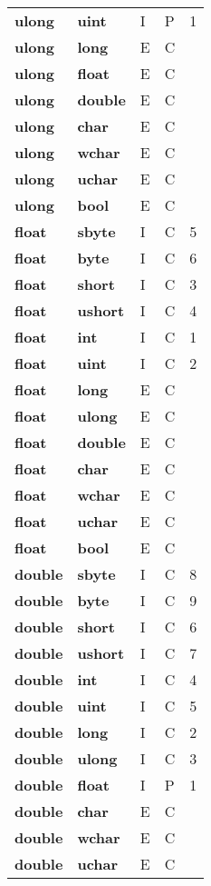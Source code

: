 \documentclass[a4paper,oneside,11pt]{book}
\theoremstyle{definition}
\begin{document}
\begin{flushleft}
\begin{supertabular}{lllll}
\textbf{ulong}& \textbf{uint}& I& P&1\\
\textbf{ulong}& \textbf{long}& E& C&\\
\textbf{ulong}& \textbf{float}& E& C&\\
\textbf{ulong}& \textbf{double}& E& C&\\
\textbf{ulong}& \textbf{char}& E& C&\\
\textbf{ulong}& \textbf{wchar}& E& C&\\
\textbf{ulong}& \textbf{uchar}& E& C&\\
\textbf{ulong}& \textbf{bool}& E& C&\\
\hline
\textbf{float}& \textbf{sbyte}& I& C&5\\
\textbf{float}& \textbf{byte}& I& C&6\\
\textbf{float}& \textbf{short}& I& C&3\\
\textbf{float}& \textbf{ushort}& I& C&4\\
\textbf{float}& \textbf{int}& I& C&1\\
\textbf{float}& \textbf{uint}& I& C&2\\
\textbf{float}& \textbf{long}& E& C&\\
\textbf{float}& \textbf{ulong}& E& C&\\
\textbf{float}& \textbf{double}& E& C&\\
\textbf{float}& \textbf{char}& E& C&\\
\textbf{float}& \textbf{wchar}& E& C&\\
\textbf{float}& \textbf{uchar}& E& C&\\
\textbf{float}& \textbf{bool}& E& C&\\
\hline
\textbf{double}& \textbf{sbyte}& I& C&8\\
\textbf{double}& \textbf{byte}& I& C&9\\
\textbf{double}& \textbf{short}& I& C&6\\
\textbf{double}& \textbf{ushort}& I& C&7\\
\textbf{double}& \textbf{int}& I& C&4\\
\textbf{double}& \textbf{uint}& I& C&5\\
\textbf{double}& \textbf{long}& I& C&2\\
\textbf{double}& \textbf{ulong}& I& C&3\\
\textbf{double}& \textbf{float}& I& P&1\\
\textbf{double}& \textbf{char}& E& C&\\
\textbf{double}& \textbf{wchar}& E& C&\\
\textbf{double}& \textbf{uchar}& E& C&\\

\end{supertabular}
\end{flushleft}
\end{document}
